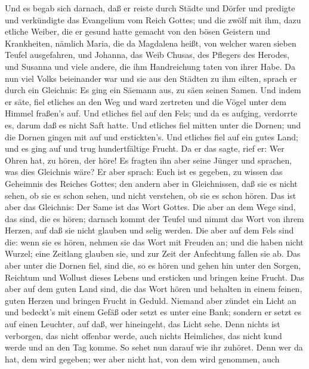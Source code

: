  Und es begab sich darnach, daß er reiste durch Städte und
Dörfer und predigte und verkündigte das Evangelium vom Reich Gottes; und
die zwölf mit ihm,  dazu etliche Weiber, die er gesund hatte
gemacht von den bösen Geistern und Krankheiten, nämlich Maria, die da
Magdalena heißt, von welcher waren sieben Teufel ausgefahren,
 und Johanna, das Weib Chusas, des Pflegers des Herodes, und
Susanna und viele andere, die ihm Handreichung taten von ihrer Habe.
 Da nun viel Volks beieinander war und sie aus den Städten
zu ihm eilten, sprach er durch ein Gleichnis:  Es ging ein
Säemann aus, zu säen seinen Samen. Und indem er säte, fiel etliches an
den Weg und ward zertreten und die Vögel unter dem Himmel fraßen's auf.
 Und etliches fiel auf den Fels; und da es aufging,
verdorrte es, darum daß es nicht Saft hatte.  Und etliches
fiel mitten unter die Dornen; und die Dornen gingen mit auf und
erstickten's.  Und etliches fiel auf ein gutes Land; und es
ging auf und trug hundertfältige Frucht. Da er das sagte, rief er: Wer
Ohren hat, zu hören, der höre!  Es fragten ihn aber seine
Jünger und sprachen, was dies Gleichnis wäre?  Er aber
sprach: Euch ist es gegeben, zu wissen das Geheimnis des Reiches Gottes;
den andern aber in Gleichnissen, daß sie es nicht sehen, ob sie es schon
sehen, und nicht verstehen, ob sie es schon hören.  Das ist
aber das Gleichnis: Der Same ist das Wort Gottes.  Die aber
an dem Wege sind, das sind, die es hören; darnach kommt der Teufel und
nimmt das Wort von ihrem Herzen, auf daß sie nicht glauben und selig
werden.  Die aber auf dem Fels sind die: wenn sie es hören,
nehmen sie das Wort mit Freuden an; und die haben nicht Wurzel; eine
Zeitlang glauben sie, und zur Zeit der Anfechtung fallen sie ab.
 Das aber unter die Dornen fiel, sind die, so es hören und
gehen hin unter den Sorgen, Reichtum und Wollust dieses Lebens und
ersticken und bringen keine Frucht.  Das aber auf dem guten
Land sind, die das Wort hören und behalten in einem feinen, guten Herzen
und bringen Frucht in Geduld.  Niemand aber zündet ein
Licht an und bedeckt's mit einem Gefäß oder setzt es unter eine Bank;
sondern er setzt es auf einen Leuchter, auf daß, wer hineingeht, das
Licht sehe.  Denn nichts ist verborgen, das nicht offenbar
werde, auch nichts Heimliches, das nicht kund werde und an den Tag
komme.  So sehet nun darauf wie ihr zuhöret. Denn wer da
hat, dem wird gegeben; wer aber nicht hat, von dem wird genommen, auch
